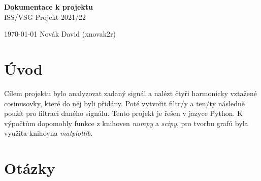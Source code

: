 \documentclass[a4paper,12pt]{article}
\begin{document}
\begin{figure}[h]
\centering
{}
\end{figure}

\begin{center}
\Huge \textbf{Dokumentace k projektu}\\
\Large ISS/VSG Projekt 2021/22


\end{center}
\mbox{}
\vfill
{\large\today}
\hfill
Novák David (xnovak2r)
\thispagestyle{empty}
\newpage

\tableofcontents
\thispagestyle{empty}
\newpage

\section{Úvod}
Cílem projektu bylo analyzovat zadaný signál a nalézt čtyři harmonicky vztažené cosinusovky, které do něj byli přidány. Poté vytvořit filtr/y a ten/ty následně použít pro filtraci daného signálu. Tento projekt je řešen v jazyce Python. K výpočtům dopomohly funkce z knihoven \emph{numpy} a \emph{scipy}, pro tvorbu grafů byla využita knihovna \emph{matplotlib}.

\section{Otázky}
\end{document}
